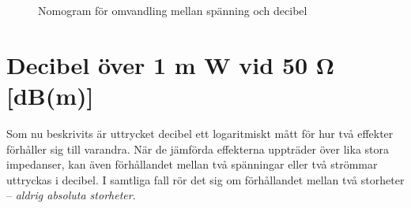 \begin{rev-raderas}
\begin{figure}
  \caption{Nomogram för omvandling mellan spänning och decibel}
  \label{appendix-c-nomogram-db-spänning}
\end{figure}

\end{rev-raderas}

\section{Decibel över 1 m W vid 50 Ω [dB(m)]}

Som nu beskrivits är uttrycket decibel ett logaritmiskt mått för hur
två effekter förhåller sig till varandra. När de jämförda effekterna
uppträder över lika stora impedanser, kan även förhållandet mellan två
spänningar eller två strömmar uttryckas i decibel. I samtliga fall rör
det sig om förhållandet mellan två storheter -- \emph{aldrig absoluta
  storheter}.

